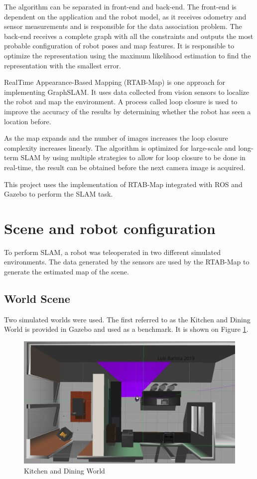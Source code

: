\documentclass[10pt,journal,compsoc]{IEEEtran}
\begin{document}
The algorithm can be separated in front-end and back-end. The front-end is  dependent on the application and the robot model, as it receives odometry and sensor measurements and is responsible for the data association problem. The back-end receives a complete graph with all the constraints and outputs the most probable configuration of robot poses and map features. It is responsible to optimize the representation using the maximum likelihood estimation to find the representation with the smallest error.

RealTime Appearance-Based Mapping (RTAB-Map) is one approach for implementing GraphSLAM. It uses data collected from vision sensors to localize the robot and map the environment. A process called loop closure is used to improve the accuracy of the results by determining whether the robot has seen a location before.

As the map expands and the number of images increases the loop closure complexity increases linearly. The algorithm is optimized for large-scale and long-term SLAM by using multiple strategies to allow for loop closure to be done in real-time, the result can be obtained before the next camera image is acquired.

This project uses the implementation of  RTAB-Map integrated with ROS and Gazebo to perform the SLAM task.





\section{Scene and robot configuration}
To perform SLAM, a robot was teleoperated in two different simulated environments. The data generated by the sensors are used by the RTAB-Map to generate the estimated map of the scene.

\subsection{World Scene}

Two simulated worlds were used. The first referred to as the Kitchen and Dining World is provided in Gazebo and used as a benchmark. It is shown on Figure \ref{fig:kitchen-dining-world}.

\begin{figure}[H]
  \includegraphics[width=\linewidth]{kd_world.png}
  \caption{Kitchen and Dining World}
  \label{fig:kitchen-dining-world}
\end{figure}
\end{document}
